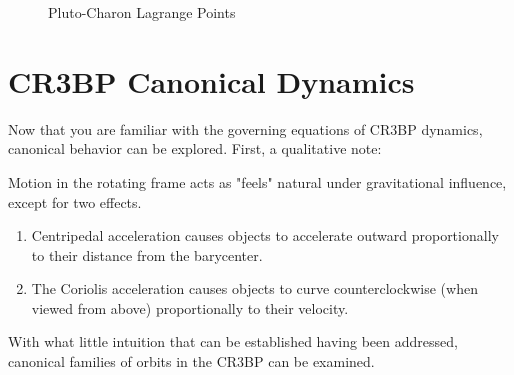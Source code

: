 \documentclass{article}
\begin{document}
\begin{figure}[H]
    \def\muEM{0.10829}
    \centering

    \caption{Pluto-Charon Lagrange Points}
\end{figure}

\section*{CR3BP Canonical Dynamics}

Now that you are familiar with the governing equations of CR3BP dynamics, canonical behavior can be explored. First, a qualitative note:

\begin{framed}
Motion in the rotating frame acts as "feels" natural under gravitational influence, except for two effects.
\begin{enumerate}
    \item Centripedal acceleration causes objects to accelerate outward proportionally to their distance from the barycenter.
    \item The Coriolis acceleration causes objects to curve counterclockwise (when viewed from above) proportionally to their velocity.
\end{enumerate}
\end{framed}

With what little intuition that can be established having been addressed, canonical families of orbits in the CR3BP can be examined.
\end{document}
